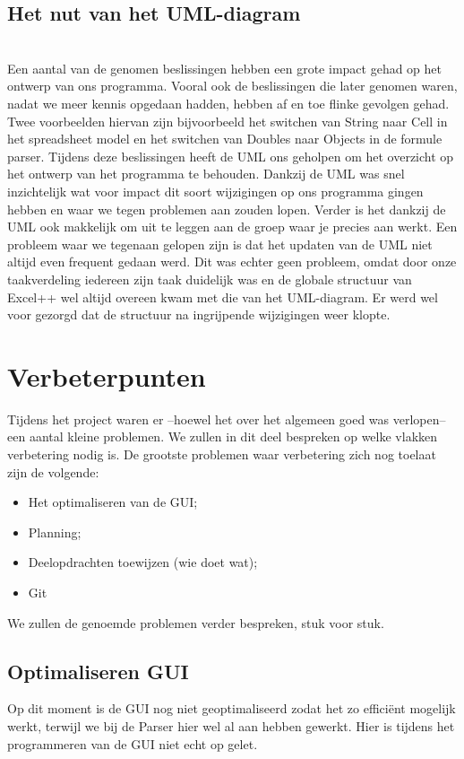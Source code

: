 \documentclass[a4paper,11pt]{article}
\begin{document}
\subsection{Het nut van het UML-diagram}\mbox{}\\
Een aantal van de genomen beslissingen hebben een grote impact gehad op het ontwerp van ons programma. Vooral ook de beslissingen die later genomen waren, nadat we meer kennis opgedaan hadden, hebben af en toe flinke gevolgen gehad. Twee voorbeelden hiervan zijn bijvoorbeeld het switchen van String naar Cell in het spreadsheet model en het switchen van Doubles naar Objects in de formule parser. Tijdens deze beslissingen heeft de UML ons geholpen om het overzicht op het ontwerp van het programma te behouden. Dankzij de UML was snel inzichtelijk wat voor impact dit soort wijzigingen op ons programma gingen hebben en waar we tegen problemen aan zouden lopen. Verder is het dankzij de UML ook makkelijk om uit te leggen aan de groep waar je precies aan werkt.
Een probleem waar we tegenaan gelopen zijn is dat het updaten van de UML niet altijd even frequent gedaan werd. Dit was echter geen probleem, omdat door onze taakverdeling iedereen zijn taak duidelijk was en de globale structuur van Excel++ wel altijd overeen kwam met die van het UML-diagram. Er werd wel voor gezorgd dat de structuur na ingrijpende wijzigingen weer klopte.

\newpage\section{Verbeterpunten}
Tijdens het project waren er –hoewel het over het algemeen goed was verlopen– een aantal kleine problemen. We zullen in dit deel bespreken op welke vlakken verbetering nodig is.
De grootste problemen waar verbetering zich nog toelaat zijn de volgende:

\begin{itemize}
	\item Het optimaliseren van de GUI;
	\item Planning;
	\item Deelopdrachten toewijzen (wie doet wat);
	\item Git
\end{itemize}

We zullen de genoemde problemen verder bespreken, stuk voor stuk.

\subsection{Optimaliseren GUI}
Op dit moment is de GUI nog niet geoptimaliseerd zodat het zo effici\"{e}nt mogelijk werkt, terwijl we bij de Parser hier wel al aan hebben gewerkt. Hier is tijdens het programmeren van de GUI niet echt 
op gelet.
\end{document}
